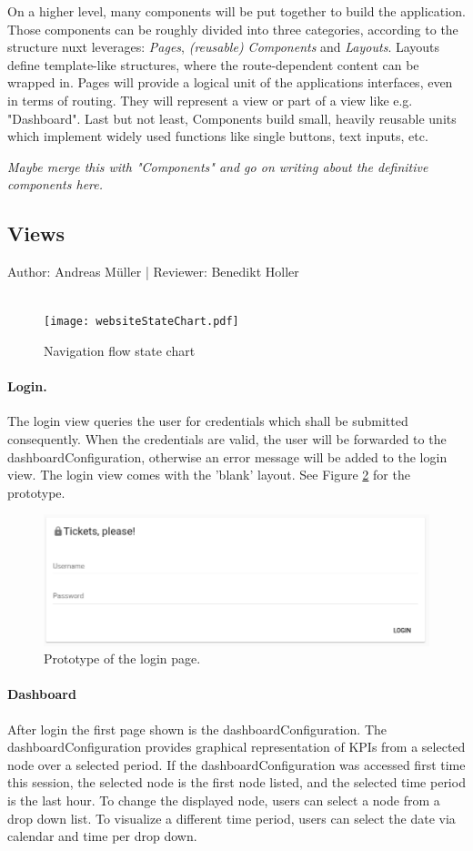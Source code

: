 \documentclass{scrreprt}
\begin{document}
On a higher level, many components will be put together to build the application. Those components
can be roughly divided into three categories, according to the structure nuxt leverages:
\emph{Pages}, \emph{(reusable) Components} and \emph{Layouts}.
Layouts define template-like structures, where the route-dependent content can be wrapped in.
Pages will provide a logical unit of the applications interfaces, even in terms of routing.
They will represent a view or part of a view like e.g. "Dashboard".
Last but not least, Components build small, heavily reusable units which implement widely used
functions like single buttons, text inputs, etc.

\emph{Maybe merge this with "Components" and go on writing about the definitive components here.}

\subsection{Views}
Author:  Andreas M\"uller |
Reviewer: Benedikt Holler\\ \\

\begin{figure}[h]
	\centering
	\texttt{[image: websiteStateChart.pdf]}
	\caption{Navigation flow state chart}
	\label{navigation}
\end{figure}

\paragraph{Login.} The login view queries the user for credentials which shall be submitted
consequently. When the credentials are valid, the user will be forwarded to the dashboardConfiguration,
otherwise an error message will be added to the login view. The login view comes with the 'blank'
layout. See Figure \ref{login} for the prototype.
\begin{figure}
  \centering
  \includegraphics[width=.7\linewidth]{prototype/login}
  \caption{Prototype of the login page.}
  \label{login}
\end{figure}
\paragraph{Dashboard}
After login the first page shown is the dashboardConfiguration.
The dashboardConfiguration provides graphical representation of KPIs from a selected node over a selected period.
If the dashboardConfiguration was accessed first time this session, the selected node is the first node listed, and the selected time period is the last hour.
To change the displayed node, users can select a node from a drop down list.
To visualize a different time period, users can select the date via calendar and time per drop down.
\end{document}
